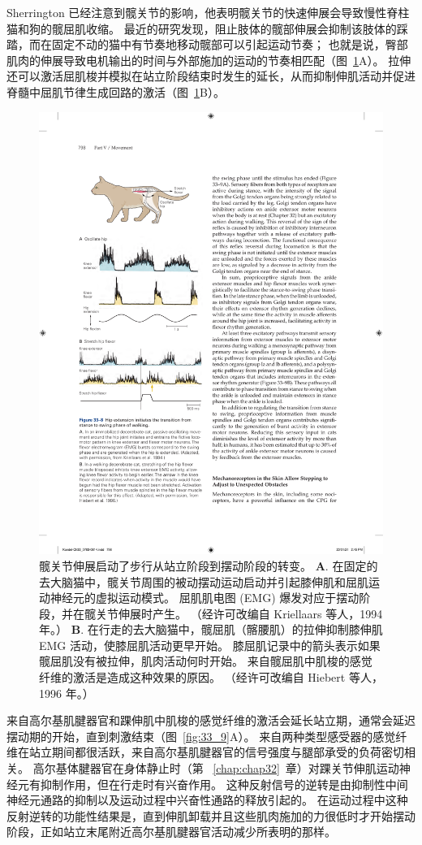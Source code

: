 Sherrington 已经注意到髋关节的影响，他表明髋关节的快速伸展会导致慢性脊柱猫和狗的髋屈肌收缩。
最近的研究发现，阻止肢体的髋部伸展会抑制该肢体的踩踏，而在固定不动的猫中有节奏地移动髋部可以引起运动节奏；
也就是说，臀部肌肉的伸展导致电机输出的时间与外部施加的运动的节奏相匹配（图~\ref{fig:33_8}A）。
拉伸还可以激活屈肌梭并模拟在站立阶段结束时发生的延长，从而抑制伸肌活动并促进脊髓中屈肌节律生成回路的激活（图~\ref{fig:33_8}B）。


\begin{figure}[htbp]
	\centering
	\includegraphics[width=0.5\linewidth]{chap33/fig_33_8}
	\caption{髋关节伸展启动了步行从站立阶段到摆动阶段的转变。
	\textbf{A}. 在固定的去大脑猫中，髋关节周围的被动摆动运动启动并引起膝伸肌和屈肌运动神经元的虚拟运动模式。
	屈肌肌电图 (EMG) 爆发对应于摆动阶段，并在髋关节伸展时产生。 （经许可改编自 Kriellaars 等人，1994 年。）
	\textbf{B}. 在行走的去大脑猫中，髋屈肌（髂腰肌）的拉伸抑制膝伸肌 EMG 活动，使膝屈肌活动更早开始。 膝屈肌记录中的箭头表示如果髋屈肌没有被拉伸，肌肉活动何时开始。 来自髋屈肌中肌梭的感觉纤维的激活是造成这种效果的原因。 （经许可改编自 Hiebert 等人，1996 年。）}
	\label{fig:33_8}
\end{figure}


来自高尔基肌腱器官和踝伸肌中肌梭的感觉纤维的激活会延长站立期，通常会延迟摆动期的开始，直到刺激结束（图~\ref{fig:33_9}A）。
来自两种类型感受器的感觉纤维在站立期间都很活跃，来自高尔基肌腱器官的信号强度与腿部承受的负荷密切相关。
高尔基体腱器官在身体静止时（第 ~\ref{chap:chap32}~章）对踝关节伸肌运动神经元有抑制作用，但在行走时有兴奋作用。
这种反射信号的逆转是由抑制性中间神经元通路的抑制以及运动过程中兴奋性通路的释放引起的。
在运动过程中这种反射逆转的功能性结果是，直到伸肌卸载并且这些肌肉施加的力很低时才开始摆动阶段，正如站立末尾附近高尔基肌腱器官活动减少所表明的那样。


